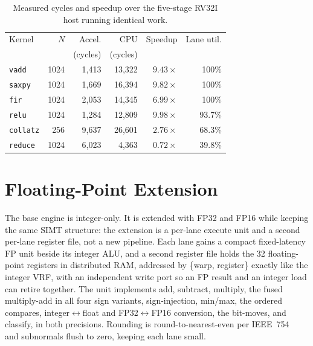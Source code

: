 \documentclass[10pt,conference]{IEEEtran}
\begin{document}
\begin{table}[t]
\caption{Measured cycles and speedup over the five-stage RV32I host running
identical work.}
\label{tab:speedup}
\centering
\footnotesize
\begin{tabular}{lrrrrr}
\toprule
Kernel & $N$ & Accel. & CPU & Speedup & Lane util.\\
       &     & (cycles) & (cycles) & & \\
\midrule
\texttt{vadd}    & 1024 & 1{,}413 & 13{,}322 & $9.43\times$ & 100\%\\
\texttt{saxpy}   & 1024 & 1{,}669 & 16{,}394 & $9.82\times$ & 100\%\\
\texttt{fir}     & 1024 & 2{,}053 & 14{,}345 & $6.99\times$ & 100\%\\
\texttt{relu}    & 1024 & 1{,}284 & 12{,}809 & $9.98\times$ & 93.7\%\\
\texttt{collatz} &  256 & 9{,}637 & 26{,}601 & $2.76\times$ & 68.3\%\\
\texttt{reduce}  & 1024 & 6{,}023 &  4{,}363 & $0.72\times$ & 39.8\%\\
\bottomrule
\end{tabular}
\end{table}

\section{Floating-Point Extension}\label{sec:fp}
The base engine is integer-only. It is extended with FP32 and FP16 while keeping
the same SIMT structure: the extension is a per-lane execute unit and a second
per-lane register file, not a new pipeline. Each lane gains a compact
fixed-latency FP unit beside its integer ALU, and a second register file holds the
32 floating-point registers in distributed RAM, addressed by \{warp, register\}
exactly like the integer VRF, with an independent write port so an FP result and
an integer load can retire together. The unit implements add, subtract, multiply,
the fused multiply-add in all four sign variants, sign-injection, min/max, the
ordered compares, integer$\leftrightarrow$float and FP32$\leftrightarrow$FP16
conversion, the bit-moves, and classify, in both precisions. Rounding is
round-to-nearest-even per IEEE~754~\cite{ieee754} and subnormals flush to zero,
keeping each lane small.
\end{document}
